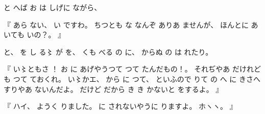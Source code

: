 %
と
へば
お
は
しげに
ながら、

%
『
あら
ない、
%
い
ですわ。
%
ちつとも
な
なんぞ
ありあ
ませんが、
%
ほんとに
あ
いても%
いの？。
』

%
と、
%
を
し
る〻%
が
を、
%
くも
べる
の
に、
%
からぬ
の
は%
れたり。

%
『
い〻ともさ%
！\inhibitglue{}%
お
に
あげやうつて
つて
たんだもの！。
%
それぢやあ
だけれども
つて
ておくれ。
%
い〻かエ、%
%
から%
に%
つて、
%
といふので
りて
の
へ
に
きさへすりやあ
ないんだよ。
%
だけど
だから
き
き%
かないと
をするよ。
』

%
『
ハイ、
%
ようく
りました。
%
に
されないやうに
りますよ。
%
ホヽヽ。
』

